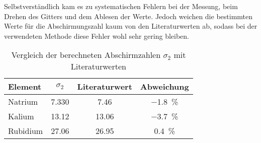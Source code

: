 Selbstverständlich kam es zu systematischen Fehlern bei der Messung, beim Drehen des Gitters und dem Ablesen der Werte. Jedoch weichen die bestimmten Werte für die Abschirmungszahl kaum von den Literaturwerten \cite{deGruyter} ab, sodass bei der verwendeten Methode diese Fehler wohl sehr gering bleiben.
\begin{table}[h!]
	\centering
	\caption{Vergleich der berechneten Abschirmzahlen $\sigma_2$ mit Literaturwerten}
	\label{tab:Literatur}
	\begin{tabular}{l|ccc}
		\toprule
		Element & $\sigma_2$ & Literaturwert & Abweichung \\
		\midrule
		Natrium & 7.330 & 7.46 & \SI{-1.8}{\%} \\
		Kalium & 13.12 & 13.06 & \SI{-3.7}{\%} \\
		Rubidium & 27.06 & 26.95 & \SI{0.4}{\%} \\
		\bottomrule
	\end{tabular}
\end{table}


